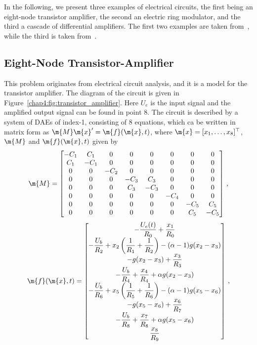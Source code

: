 In the following, we present three examples of electrical circuits, the first being an eight-node transistor amplifier, the second an electric ring modulator, and the third a cascade of differential amplifiers. The first two examples are taken from~\cite{lioen1998test, mazzia2008test}, while the third is taken from~\cite{brenan1995numerical}.

\subsection{Eight-Node Transistor-Amplifier}

This problem originates from electrical circuit analysis, and it is a model for the transistor amplifier. The diagram of the circuit is given in Figure~\ref{chap4:fig:transistor_amplifier}. Here $U_e$ is the input signal and the amplified output signal can be found in point 8. The circuit is described by a system of \acp{DAE} of index-1, consisting of 8 equations, which ca be written in matrix form as $\m{M}\m{x}^\prime = \m{f}(\m{x},t)$, where $\m{x} = [x_1, \dots, x_8]^\top$, $\m{M}$ and $\m{f}(\m{x},t)$ given by
%
\begin{equation}
  \m{M} = \begin{bmatrix}
    -C_1 & C_1 & 0 & 0 & 0 & 0 & 0 & 0 \\
    C_1 & -C_1 & 0 & 0 & 0 & 0 & 0 & 0 \\
    0 & 0 & -C_2 & 0 & 0 & 0 & 0 & 0 \\
    0 & 0 & 0 & -C_3 & C_3 & 0 & 0 & 0 \\
    0 & 0 & 0 & C_3 & -C_3 & 0 & 0 & 0 \\
    0 & 0 & 0 & 0 & 0 & -C_4 & 0 & 0 \\
    0 & 0 & 0 & 0 & 0 & 0 & -C_5 & C_5 \\
    0 & 0 & 0 & 0 & 0 & 0 & C_5 & -C_5
  \end{bmatrix} \, \text{,}
\end{equation}
%
\begin{equation}
  \m{f}(\m{x},t) = \begin{bmatrix}
    -\dfrac{U_e(t)}{R_0} + \dfrac{x_1}{R_0} \\
    -\dfrac{U_b}{R_2} + x_2\left(\dfrac{1}{R_1}+\dfrac{1}{R_2}\right) - (\alpha-1)g(x_2-x_3) \\
    -g(x_2-x_3)+\dfrac{x_3}{R_3} \\
    -\dfrac{U_b}{R_4} + \dfrac{x_4}{R_4} + \alpha g(x_2-x_3) \\
    -\dfrac{U_b}{R_6} + x_5\left(\dfrac{1}{R_5} + \dfrac{1}{R_6}\right)-(\alpha-1) g(x_5-x_6) \\
    -g(x_5-x_6) + \dfrac{x_6}{R_7} \\
    -\dfrac{U_b}{R_8} + \dfrac{x_7}{R_8} + \alpha g(x_5-x_6) \\
    \dfrac{x_8}{R_9}
  \end{bmatrix} \, \text{,}
\end{equation}
